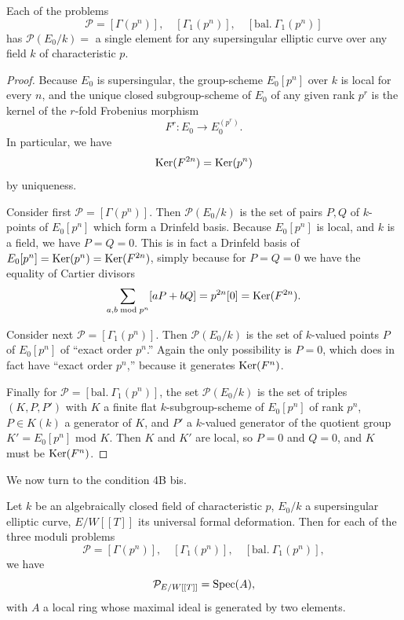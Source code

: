 \begin{klem}\label{lem:5.3.1}
Each of the problems
\[
\mathcal{P} = [\Gamma(p^n)],\quad [\Gamma_1(p^n)],\quad [\mathrm{bal.}\ \Gamma_1(p^n)]
\]
has $\mathcal{P}(E_0/k) = $ a single element for any supersingular elliptic curve over any field $k$ of characteristic $p$.
\end{klem}

\begin{proof}
Because $E_0$ is supersingular, the group-scheme $E_0[p^n]$ over $k$ is local for every $n$, and the unique closed subgroup-scheme of $E_0$ of any given rank $p^r$ is the kernel of the $r$-fold Frobenius morphism
\[
F^r : E_0 \longrightarrow E_0^{(p^r)}.
\]
In particular, we have
\[
\operatorname{Ker}(F^{2n}) = \operatorname{Ker}(p^n)
\]
by uniqueness.

Consider first $\mathcal{P} = [\Gamma(p^n)]$. Then $\mathcal{P}(E_0/k)$ is the set of pairs $P, Q$ of $k$-points of $E_0[p^n]$ which form a Drinfeld basis. Because $E_0[p^n]$ is local, and $k$ is a field, we have $P = Q = 0$. This is in fact a Drinfeld basis of $E_0[p^n] = \operatorname{Ker}(p^n) = \operatorname{Ker}(F^{2n})$, simply because for $P = Q = 0$ we have the equality of Cartier divisors
\[
\sum_{a, b \bmod p^n} [aP + bQ] = p^{2n}[0] = \operatorname{Ker}(F^{2n}).
\]

Consider next $\mathcal{P} = [\Gamma_1(p^n)]$. Then $\mathcal{P}(E_0/k)$ is the set of $k$-valued points $P$ of $E_0[p^n]$ of ``exact order $p^n$.'' Again the only possibility is $P = 0$, which does in fact have ``exact order $p^n$,'' because it generates $\operatorname{Ker}(F^n)$.

Finally for $\mathcal{P} = [\mathrm{bal.}\ \Gamma_1(p^n)]$, the set $\mathcal{P}(E_0/k)$ is the set of triples $(K, P, P')$ with $K$ a finite flat $k$-subgroup-scheme of $E_0[p^n]$ of rank $p^n$, $P \in K(k)$ a generator of $K$, and $P'$ a $k$-valued generator of the quotient group $K' = E_0[p^n]$ mod $K$. Then $K$ and $K'$ are local, so $P = 0$ and $Q = 0$, and $K$ must be $\operatorname{Ker}(F^n)$.
\end{proof}

We now turn to the condition 4B bis.

\begin{kthm}\label{thm:5.3.2}
Let $k$ be an algebraically closed field of characteristic $p$, $E_0/k$ a supersingular elliptic curve, $E/W[[T]]$ its universal formal deformation. Then for each of the three moduli problems
\[
\mathcal{P} = [\Gamma(p^n)],\quad [\Gamma_1(p^n)],\quad [\mathrm{bal.}\ \Gamma_1(p^n)],
\]
we have
\[
\mathcal{P}_{E/W[[T]]} = \operatorname{Spec}(A),
\]
with $A$ a local ring whose maximal ideal is generated by two elements.
\end{kthm}

